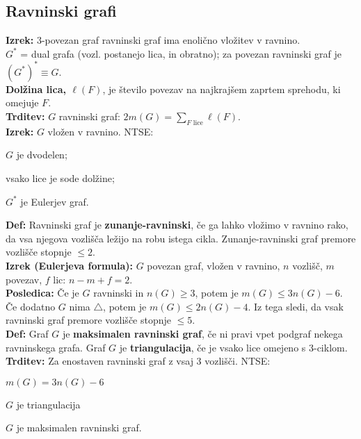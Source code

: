 \documentclass[a4paper,10pt]{article}
\theoremstyle{definition}
\newenvironment{enumerate*}%
{
\vspace{-10pt}
\begin{enumerate}
\setlength{\itemsep}{0pt}
\setlength{\parskip}{2pt}
}
{\end{enumerate}
\vspace{-10pt}}
\let\oldtextbf\textbf
\renewcommand{\textbf}[1]{\oldtextbf{\boldmath #1}}
\begin{document}
\subsection*{Ravninski grafi}
\textbf{Izrek:} 3-povezan graf ravninski graf ima enolično vložitev v ravnino.\\
\textbf{$G^*$} = dual grafa (vozl. postanejo lica, in obratno); za povezan ravninski graf je $(G^*)^* \equiv G$.\\
\textbf{Dolžina lica, $\ell(F)$}, je število povezav na najkrajšem zaprtem sprehodu, ki omejuje $F$.\\
\textbf{Trditev:} $G$ ravninski graf: $2 m(G) = \sum_{F \text{ lice}} \ell(F)$.\\
\textbf{Izrek:} $G$ vložen v ravnino. NTSE:
\begin{enumerate*}
\item $G$ je dvodelen;
\item vsako lice je sode dolžine;
\item $G^*$ je Eulerjev graf.
\end{enumerate*}
\textbf{Def:} Ravninski graf je \textbf{zunanje-ravninski}, če ga lahko vložimo v ravnino rako, da vsa njegova vozlišča ležijo na robu istega cikla. Zunanje-ravninski graf premore vozlišče stopnje $\leq 2$.\\
\textbf{Izrek (Eulerjeva formula):} $G$ povezan graf, vložen v ravnino, $n$ vozlišč, $m$ povezav, $f$ lic: $n - m + f = 2$.\\
\textbf{Posledica:} Če je $G$ ravninski in $n(G) \geq 3$, potem je $m(G) \leq 3 n(G) - 6$. Če dodatno $G$ nima $\triangle$, potem je $m(G) \leq 2 n(G) - 4$. Iz tega sledi, da vsak ravninski graf premore vozlišče stopnje $\leq 5$.\\
\textbf{Def:} Graf $G$ je \textbf{maksimalen ravninski graf}, če ni pravi vpet podgraf nekega ravninskega grafa. Graf $G$ je \textbf{triangulacija}, če je vsako lice omejeno s 3-ciklom.\\
\textbf{Trditev:} Za enostaven ravninski graf z vsaj 3 vozlišči. NTSE:
\begin{enumerate*}
\item $m(G) = 3 n(G) - 6$
\item $G$ je triangulacija
\item $G$ je maksimalen ravninski graf.
\end{enumerate*}
\end{document}
